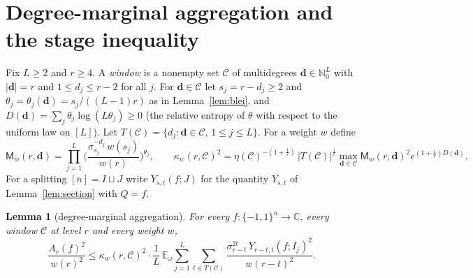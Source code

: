 \documentclass[11pt]{amsart}
\newtheorem{lemma}[theorem]{Lemma}
\theoremstyle{definition}
\newcommand{\C}{\mathbb{C}}
\newcommand{\N}{\mathbb{N}}
\newcommand{\E}{\mathbb{E}}
\newcommand{\bd}{\mathbf d}
\begin{document}
\section{Degree-marginal aggregation and the stage inequality}\label{sec:agg}

Fix $L\ge2$ and $r\ge4$. A \emph{window} is a nonempty set $\mathcal C$ of multidegrees $\bd\in\N_0^L$ with $|\bd|=r$ and $1\le d_j\le r-2$ for all $j$. For $\bd\in\mathcal C$ let $s_j=r-d_j\ge2$ and $\theta_j=\theta_j(\bd)=s_j/((L-1)r)$ as in Lemma~\ref{lem:blei}, and $D(\bd)=\sum_j\theta_j\log(L\theta_j)\ge0$ (the relative entropy of $\theta$ with respect to the uniform law on $[L]$). Let $T(\mathcal C)=\{d_j:\bd\in\mathcal C,\,1\le j\le L\}$. For a weight $w$ define
\[
\mathsf M_w(r,\bd)=\prod_{j=1}^L\Big(\frac{\sigma_{s_j}^{-d_j}\,w(s_j)}{w(r)}\Big)^{\theta_j},\qquad
\kappa_w(r,\mathcal C)^2=\eta(\mathcal C)^{-(1+\frac1r)}\,|T(\mathcal C)|^{\frac1r}\max_{\bd\in\mathcal C}\mathsf M_w(r,\bd)^2e^{(1+\frac1r)D(\bd)} .
\]
For a splitting $[n]=I\sqcup J$ write $Y_{s,t}(f;J)$ for the quantity $Y_{s,t}$ of Lemma~\ref{lem:section} with $Q=f$.

\begin{lemma}[degree-marginal aggregation]\label{lem:agg}
For every $f:\{-1,1\}^n\to\C$, every window $\mathcal C$ at level $r$ and every weight $w$,
\[
\frac{A_r(f)^2}{w(r)^2}\le\kappa_w(r,\mathcal C)^2\cdot\frac1L\,\E_\omega\sum_{j=1}^L\sum_{t\in T(\mathcal C)}\frac{\sigma_{r-t}^{2t}\,Y_{r-t,t}(f;I_j)^2}{w(r-t)^2}.
\]
\end{lemma}
\end{document}
